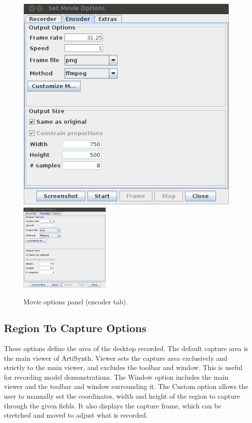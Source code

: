 \documentclass{article}
\begin{document}
\begin{figure}
\begin{center}
\iflatexml
\includegraphics[]{images/moviePanel2}
\else
\includegraphics[width=0.40\textwidth]{images/moviePanel2}
\fi
\end{center}
\caption{Movie options panel (encoder tab).}%
\label{movieOptionsEncoderFig}
\end{figure}

\subsection{Region To Capture Options}

These options define the area of the desktop recorded. The default
capture area is the main viewer of ArtiSynth. {\sf Viewer} sets the capture
area exclusively and strictly to the main viewer, and excludes the toolbar
and window. This is useful for recording model demonstrations. The
{\sf Window} option includes the main viewer and the toolbar and window
surrounding it. The {\sf Custom} option allows the user to manually set the 
coordinates, width and height of the region to capture through the given
fields.  It also displays the capture frame, which can be stretched and 
moved to adjust what is recorded.
\end{document}
